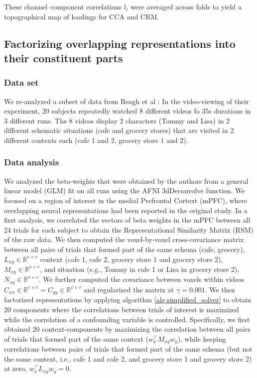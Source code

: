 \documentclass{article}
\begin{document}
These channel–component correlations \(l_i\) were averaged across folds to yield a topographical map of loadings for CCA and CRM.


\subsection*{Factorizing overlapping representations into their constituent parts}
\subsubsection*{Data set} We re-analyzed a subset of data from Reagh et al \cite{reaghFlexibleReuseCorticohippocampal2023a}: In the video-viewing of their experiment,
20 subjects repeatedly watched 8 different videos fo 35s durations in 3 different runs. The 8 videos display 2 characters (Tommy and Lisa) in 2 different schematic situations (cafe and grocery stores) that are visited in 2 different contexts each (cafe 1 and 2, grocery store 1 and 2).
\subsubsection*{Data analysis}
We analyzed the beta-weights that were obtained by the authors from a general linear model (GLM) fit on all runs using the AFNI 3dDeconvolve function. We focused on a region of interest in the medial Prefrontal Cortext (mPFC), where overlapping neural representations had been reported in the original study. In a first analysis, we correlated the vectors of beta weights in the mPFC between all 24 trials for each subject to obtain the Representational Similarity Matrix (RSM) of the raw data. We then computed the voxel-by-voxel cross-covariance matrix between all pairs of trials that formed part of the same schema (cafe, grocery), $L_{xy} \in \mathbb{R}^{v \times v}$ context (cafe 1, cafe 2, grocery store 1 and grocery store 2), $M_{xy} \in \mathbb{R}^{v \times v}$, and situation (e.g., Tommy in cafe 1 or Lisa in grocery store 2), $N_{xy} \in \mathbb{R}^{v \times v}$. We further computed the covariance between voxels within videos $C_{xx} \in \mathbb{R}^{v \times v} = C_{yy} \in \mathbb{R}^{v \times v}$ and regularized the matrix at $\gamma = 0.001$. We then factorized representations by applying algorithm \ref{alg:simplified_solver} to obtain 20 components where the correlations between trials of interest is maximized while the correlation of a confounding variable is controlled. Specifically, we first obtained 20 context-components by maximizing the correlation between all pairs of trials that formed part of the same context ($w_x^\top M_{xy} w_y$), while keeping correlations between pairs of trials that formed part of the same schema (but not the same context, i.e., cafe 1 and cafe 2, and grocery store 1 and grocery store 2) at zero, $w_x^\top L_{xy} w_y = 0$.
\end{document}
